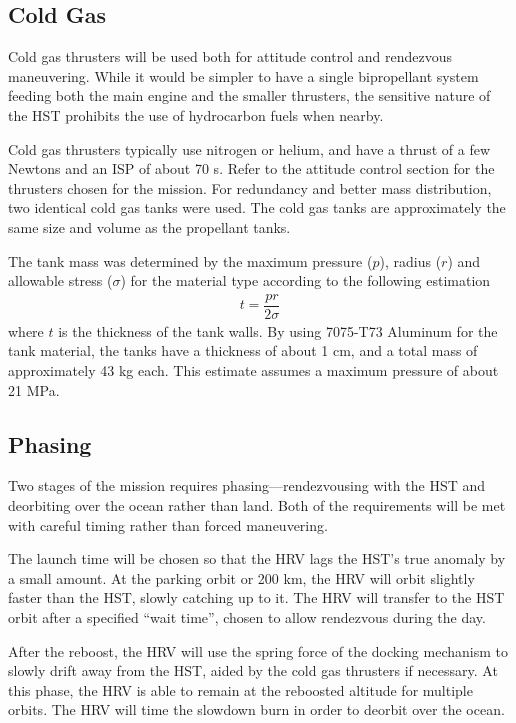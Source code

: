 \documentclass[paper=letter, fontsize=11pt]{scrartcl} %
\numberwithin{equation}{section} %
\numberwithin{figure}{section} %
\numberwithin{table}{section} %
\begin{document}
\subsection{Cold Gas}

Cold gas thrusters will be used both for attitude control and rendezvous maneuvering. While it would be simpler to have a single bipropellant system feeding both the main engine and the smaller thrusters, the sensitive nature of the HST prohibits the use of hydrocarbon fuels when nearby.

Cold gas thrusters typically use nitrogen or helium, and have a thrust of a few Newtons and an ISP of about 70 s. Refer to the attitude control section for the thrusters chosen for the mission. For redundancy and better mass distribution, two identical cold gas tanks were used. The cold gas tanks are approximately the same size and volume as the propellant tanks.

The tank mass was determined by the maximum pressure ($p$), radius ($r$) and allowable stress ($\sigma$) for the material type according to the following estimation
\begin{align*}
    t = \dfrac{p r}{2 \sigma}
\end{align*}
where $t$ is the thickness of the tank walls. By using 7075-T73 Aluminum for the tank material, the tanks have a thickness of about 1 cm, and a total mass of approximately 43 kg each. This estimate assumes a maximum pressure of about 21 MPa.

\subsection{Phasing}

Two stages of the mission requires phasing---rendezvousing with the HST and deorbiting over the ocean rather than land. Both of the requirements will be met with careful timing rather than forced maneuvering.

The launch time will be chosen so that the HRV lags the HST's true anomaly by a small amount. At the parking orbit or 200 km, the HRV will orbit slightly faster than the HST, slowly catching up to it. The HRV will transfer to the HST orbit after a specified ``wait time'', chosen to allow rendezvous during the day.

After the reboost, the HRV will use the spring force of the docking mechanism to slowly drift away from the HST, aided by the cold gas thrusters if necessary. At this phase, the HRV is able to remain at the reboosted altitude for multiple orbits. The HRV will time the slowdown burn in order to deorbit over the ocean.
\end{document}
